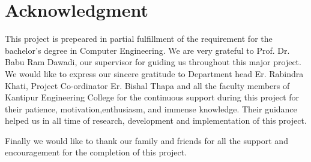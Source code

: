 \chapter*{Acknowledgment}
This project is prepeared in partial fulfillment of the requirement for the bachelor's degree in Computer Engineering. We are very grateful to Prof. Dr. Babu Ram Dawadi, our supervisor for guiding us throughout this major project. We would like to express our sincere gratitude to Department head Er. Rabindra Khati, Project Co-ordinator Er. Bishal Thapa and all the faculty members of Kantipur Engineering College for the continuous support during this project for their patience, motivation,enthusiasm, and immense knowledge. Their guidance helped us in all time of research, development and implementation of this project.\par
Finally we would like to thank our family and friends for all the support and encouragement for the completion of this project.\par
\begin{flushright}
\vskip -20pt
\submittedBy

\end{flushright}

{
\KECadjusttocspacings %
\makeatletter
\def\@makeschapterhead#1{%
  {\newpage \parindent \z@ \raggedright
    \normalfont
    \interlinepenalty\@M
    \center \fontsize{16pt}{1} \bfseries \MakeUppercase{#1}\par\nobreak
  }}
\makeatother 

\tableofcontents %
\listoffigures %
\listoftables %
}
